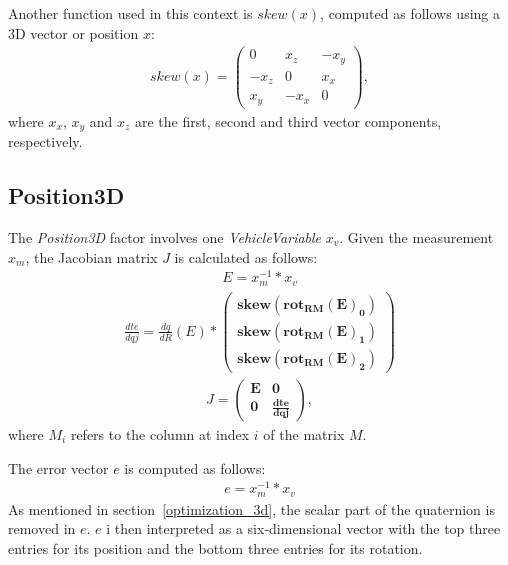 Another function used in this context is $skew(x)$, computed as follows using a 3D vector or position $x$:
\begin{align}
	skew(x) =
	\begin{pmatrix}
		   0 &  x_z & -x_y\\
		-x_z &    0 &  x_x\\
		 x_y & -x_x &    0
	\end{pmatrix},
\end{align}
where $x_x$, $x_y$ and $x_z$ are the first, second and third vector components, respectively.



\subsection{Position3D}
The \textit{Position3D} factor involves one \textit{VehicleVariable} $x_v$. Given the measurement $x_m$, the Jacobian matrix $J$ is calculated as follows:
\begin{align}
	E = x_m^{-1} * x_v
\end{align}
\begin{align}
	\frac{dte}{dqj} = \frac{dq}{dR}(E) *
	\begin{pmatrix}
		\boldsymbol{skew(rot_{RM}(E)_0)}\\
		\boldsymbol{skew(rot_{RM}(E)_1)}\\
		\boldsymbol{skew(rot_{RM}(E)_2)}
	\end{pmatrix}
\end{align}
\begin{align}
	J =
	\begin{pmatrix}
		\boldsymbol{E} &               \boldsymbol{0}\\
		\boldsymbol{0} & \boldsymbol{\frac{dte}{dqj}}
	\end{pmatrix},
\end{align}
where $M_i$ refers to the column at index $i$ of the matrix $M$.

The error vector $e$ is computed as follows:
\begin{align}
	e = x_m^{-1} * x_v
\end{align}
As mentioned in section~\ref{optimization_3d}, the scalar part of the quaternion is removed in $e$. $e$ i then interpreted as a six-dimensional vector with the top three entries for its position and the bottom three entries for its rotation.



